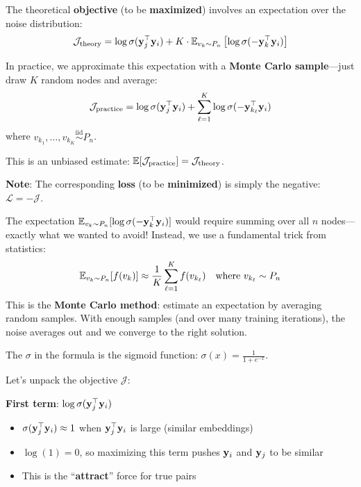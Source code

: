 \begin{notechapter}
\begin{definition}
The theoretical \textbf{objective} (to be \textbf{maximized}) involves an expectation over the noise distribution:
\[
\mathcal{J}_{\text{theory}} = \log \sigma(\mathbf{y}_j^\top \mathbf{y}_i) + K \cdot \mathbb{E}_{v_{k} \sim P_n}\left[\log \sigma(-\mathbf{y}_{k}^\top \mathbf{y}_i)\right]
\]

In practice, we approximate this expectation with a \textbf{Monte Carlo sample}---just draw $K$ random nodes and average:
\[
\mathcal{J}_{\text{practice}} = \log \sigma(\mathbf{y}_j^\top \mathbf{y}_i) + \sum_{\ell=1}^{K} \log \sigma(-\mathbf{y}_{k_\ell}^\top \mathbf{y}_i)
\]
where $v_{k_1}, \ldots, v_{k_K} \overset{\text{iid}}{\sim} P_n$.

This is an unbiased estimate: $\mathbb{E}[\mathcal{J}_{\text{practice}}] = \mathcal{J}_{\text{theory}}$.

\textbf{Note}: The corresponding \textbf{loss} (to be \textbf{minimized}) is simply the negative: $\mathcal{L} = -\mathcal{J}$.
\end{definition}

\begin{remark}
The expectation $\mathbb{E}_{v_k \sim P_n}[\log \sigma(-\mathbf{y}_k^\top \mathbf{y}_i)]$ would require summing over all $n$ nodes---exactly what we wanted to avoid! Instead, we use a fundamental trick from statistics:
\[
\mathbb{E}_{v_k \sim P_n}[f(v_k)] \approx \frac{1}{K} \sum_{\ell=1}^{K} f(v_{k_\ell}) \quad \text{where } v_{k_\ell} \sim P_n
\]
This is the \textbf{Monte Carlo method}: estimate an expectation by averaging random samples. With enough samples (and over many training iterations), the noise averages out and we converge to the right solution.

The $\sigma$ in the formula is the sigmoid function: $\sigma(x) = \frac{1}{1+e^{-x}}$.
\end{remark}

\begin{intuition}
Let's unpack the objective $\mathcal{J}$:

\textbf{First term}: $\log \sigma(\mathbf{y}_j^\top \mathbf{y}_i)$
\begin{itemize}
    \item $\sigma(\mathbf{y}_j^\top \mathbf{y}_i) \approx 1$ when $\mathbf{y}_j^\top \mathbf{y}_i$ is large (similar embeddings)
    \item $\log(1) = 0$, so maximizing this term pushes $\mathbf{y}_i$ and $\mathbf{y}_j$ to be similar
    \item This is the ``\textbf{attract}'' force for true pairs
\end{itemize}


\end{intuition}
\end{notechapter}
